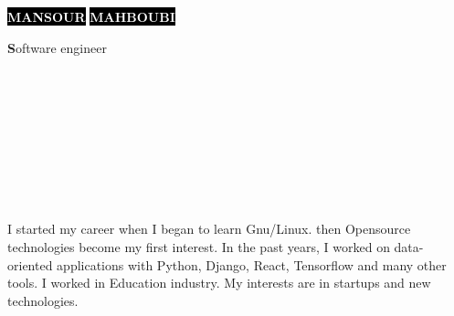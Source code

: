 \documentclass[9pt]{developercv}
\begin{document}
\begin{minipage}[t]{0.36\textwidth}
	\vspace{-\baselineskip}

	\colorbox{black}{{\HUGE\textcolor{white}{\textbf{\MakeUppercase{Mansour}}}}} %
	\colorbox{black}{{\HUGE\textcolor{white}{\textbf{\MakeUppercase{Mahboubi}}}}} %
	\vspace{6pt}

	{\huge\textbf Software engineer}
\end{minipage}
\begin{minipage}[t]{0.35\textwidth}
	\vspace{-\baselineskip}

	\\
	\\
	\\
	\\
\end{minipage}
\begin{minipage}[t]{0.275\textwidth}
	\vspace{-\baselineskip}

	\\
	\\
	\\
\end{minipage}
\vspace{0.5cm}

\begin{minipage}[t]{1\textwidth}
	\vspace{-\baselineskip}

	I started my career when I began to learn Gnu/Linux. then Opensource technologies become my first interest.
	In the past years, I worked on data-oriented applications with Python, Django, React, Tensorflow and many other tools. I worked in Education  industry. My interests are in startups and new technologies.
\end{minipage}
\end{document}

